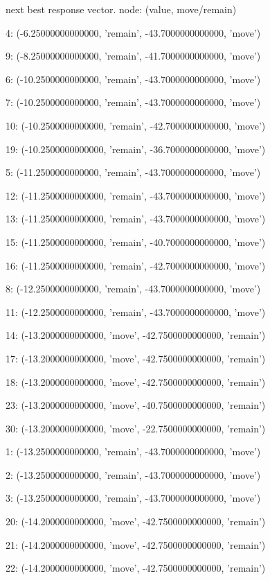 \clearpage \pagebreak


 next best response vector.  node: (value, move/remain)


4: (-6.25000000000000, 'remain', -43.7000000000000, 'move')


9: (-8.25000000000000, 'remain', -41.7000000000000, 'move')


6: (-10.2500000000000, 'remain', -43.7000000000000, 'move')


7: (-10.2500000000000, 'remain', -43.7000000000000, 'move')


10: (-10.2500000000000, 'remain', -42.7000000000000, 'move')


19: (-10.2500000000000, 'remain', -36.7000000000000, 'move')


5: (-11.2500000000000, 'remain', -43.7000000000000, 'move')


12: (-11.2500000000000, 'remain', -43.7000000000000, 'move')


13: (-11.2500000000000, 'remain', -43.7000000000000, 'move')


15: (-11.2500000000000, 'remain', -40.7000000000000, 'move')


16: (-11.2500000000000, 'remain', -42.7000000000000, 'move')


8: (-12.2500000000000, 'remain', -43.7000000000000, 'move')


11: (-12.2500000000000, 'remain', -43.7000000000000, 'move')


14: (-13.2000000000000, 'move', -42.7500000000000, 'remain')


17: (-13.2000000000000, 'move', -42.7500000000000, 'remain')


18: (-13.2000000000000, 'move', -42.7500000000000, 'remain')


23: (-13.2000000000000, 'move', -40.7500000000000, 'remain')


30: (-13.2000000000000, 'move', -22.7500000000000, 'remain')


1: (-13.2500000000000, 'remain', -43.7000000000000, 'move')


2: (-13.2500000000000, 'remain', -43.7000000000000, 'move')


3: (-13.2500000000000, 'remain', -43.7000000000000, 'move')


20: (-14.2000000000000, 'move', -42.7500000000000, 'remain')


21: (-14.2000000000000, 'move', -42.7500000000000, 'remain')


22: (-14.2000000000000, 'move', -42.7500000000000, 'remain')


